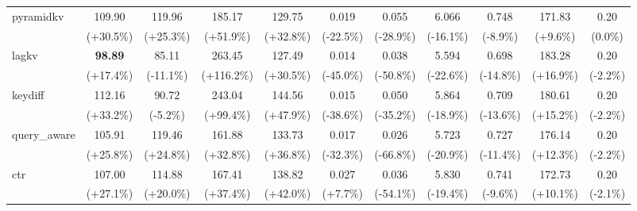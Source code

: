 \begin{table}[t]
{\begin{tabular}{l|cccccccccc}
    pyramidkv & 109.90 & 119.96 & 185.17 & 129.75 & 0.019 & 0.055 & 6.066 & 0.748 & 171.83 & 0.20 \\
     & {\tiny\color{red!70!black}(+30.5\%)} & {\tiny\color{red!70!black}(+25.3\%)} & {\tiny\color{red!70!black}(+51.9\%)} & {\tiny\color{red!70!black}(+32.8\%)} & {\tiny\color{green!60!black}(-22.5\%)} & {\tiny\color{green!60!black}(-28.9\%)} & {\tiny\color{green!60!black}(-16.1\%)} & {\tiny\color{green!60!black}(-8.9\%)} & {\tiny\color{green!60!black}(+9.6\%)} & {\tiny\color{gray}(0.0\%)} \\
    lagkv & \textbf{98.89} & 85.11 & 263.45 & 127.49 & 0.014 & 0.038 & 5.594 & 0.698 & 183.28 & 0.20 \\
     & {\tiny\color{red!70!black}(+17.4\%)} & {\tiny\color{green!60!black}(-11.1\%)} & {\tiny\color{red!70!black}(+116.2\%)} & {\tiny\color{red!70!black}(+30.5\%)} & {\tiny\color{green!60!black}(-45.0\%)} & {\tiny\color{green!60!black}(-50.8\%)} & {\tiny\color{green!60!black}(-22.6\%)} & {\tiny\color{green!60!black}(-14.8\%)} & {\tiny\color{green!60!black}(+16.9\%)} & {\tiny\color{green!60!black}(-2.2\%)} \\
    keydiff & 112.16 & 90.72 & 243.04 & 144.56 & 0.015 & 0.050 & 5.864 & 0.709 & 180.61 & 0.20 \\
     & {\tiny\color{red!70!black}(+33.2\%)} & {\tiny\color{green!60!black}(-5.2\%)} & {\tiny\color{red!70!black}(+99.4\%)} & {\tiny\color{red!70!black}(+47.9\%)} & {\tiny\color{green!60!black}(-38.6\%)} & {\tiny\color{green!60!black}(-35.2\%)} & {\tiny\color{green!60!black}(-18.9\%)} & {\tiny\color{green!60!black}(-13.6\%)} & {\tiny\color{green!60!black}(+15.2\%)} & {\tiny\color{green!60!black}(-2.2\%)} \\
    query\_aware & 105.91 & 119.46 & 161.88 & 133.73 & 0.017 & 0.026 & 5.723 & 0.727 & 176.14 & 0.20 \\
     & {\tiny\color{red!70!black}(+25.8\%)} & {\tiny\color{red!70!black}(+24.8\%)} & {\tiny\color{red!70!black}(+32.8\%)} & {\tiny\color{red!70!black}(+36.8\%)} & {\tiny\color{green!60!black}(-32.3\%)} & {\tiny\color{green!60!black}(-66.8\%)} & {\tiny\color{green!60!black}(-20.9\%)} & {\tiny\color{green!60!black}(-11.4\%)} & {\tiny\color{green!60!black}(+12.3\%)} & {\tiny\color{green!60!black}(-2.2\%)} \\
    ctr & 107.00 & 114.88 & 167.41 & 138.82 & 0.027 & 0.036 & 5.830 & 0.741 & 172.73 & 0.20 \\
     & {\tiny\color{red!70!black}(+27.1\%)} & {\tiny\color{red!70!black}(+20.0\%)} & {\tiny\color{red!70!black}(+37.4\%)} & {\tiny\color{red!70!black}(+42.0\%)} & {\tiny\color{red!70!black}(+7.7\%)} & {\tiny\color{green!60!black}(-54.1\%)} & {\tiny\color{green!60!black}(-19.4\%)} & {\tiny\color{green!60!black}(-9.6\%)} & {\tiny\color{green!60!black}(+10.1\%)} & {\tiny\color{green!60!black}(-2.1\%)} \\

\end{tabular}}
\end{table}

